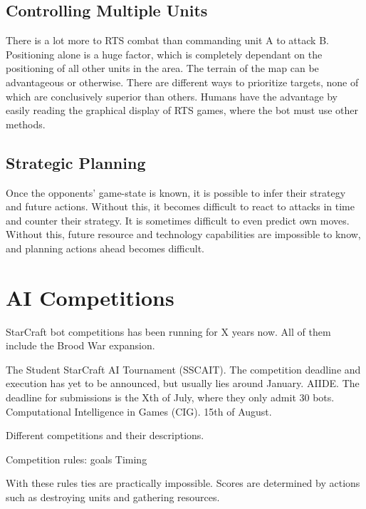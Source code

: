 	
	
	\subsection*{Controlling Multiple Units}
	There is a lot more to RTS combat than commanding unit A to attack B. Positioning alone is a huge factor, which is completely dependant on the positioning of all other units in the area. The terrain of the map can be advantageous or otherwise. There are different ways to prioritize targets, none of which are conclusively superior than others. Humans have the advantage by easily reading the graphical display of RTS games, where the bot must use other methods.
	
	
	

	\subsection*{Strategic Planning}
	Once the opponents' game-state is known, it is possible to infer their strategy and future actions. Without this, it becomes difficult to react to attacks in time and counter their strategy. It is sometimes difficult to even predict own moves. Without this, future resource and technology capabilities are impossible to know, and planning actions ahead becomes difficult.
	
	

\section{AI Competitions}
StarCraft bot competitions has been running for X years now. All of them include the Brood War expansion.

The Student StarCraft AI Tournament (SSCAIT). The competition deadline and execution has yet to be announced, but usually lies around January.
AIIDE. The deadline for submissions is the Xth of July, where they only admit 30 bots.
Computational Intelligence in Games (CIG). 15th of August.

Different competitions and their descriptions.

Competition rules:
goals
Timing

With these rules ties are practically impossible. Scores are determined by actions such as destroying units and gathering resources.